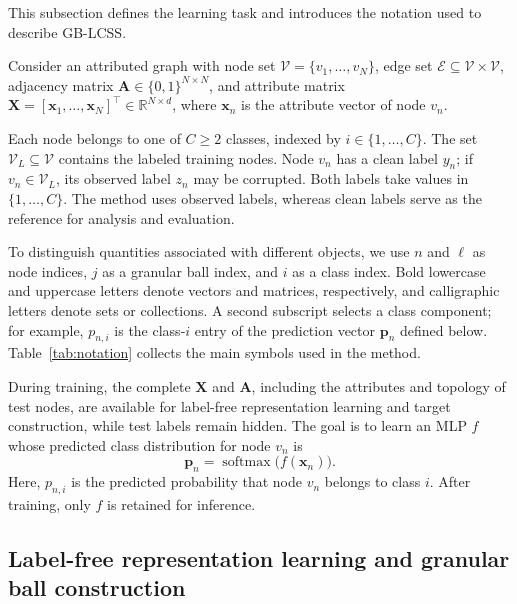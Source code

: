 \documentclass[10pt,letterpaper,nopreprintline]{elsarticle}
\theoremstyle{definition}
\theoremstyle{plain}
\begin{document}
This subsection defines the learning task and introduces the notation used to describe GB-LCSS.

Consider an attributed graph with node set \(\mathcal V=\{v_1,\ldots,v_N\}\), edge set \(\mathcal E\subseteq\mathcal V\times\mathcal V\), adjacency matrix \(\mathbf A\in\{0,1\}^{N\times N}\), and attribute matrix \(\mathbf X=[\mathbf x_1,\ldots,\mathbf x_N]^\top\in\mathbb R^{N\times d}\), where \(\mathbf x_n\) is the attribute vector of node \(v_n\).

Each node belongs to one of \(C\geq2\) classes, indexed by \(i\in\{1,\ldots,C\}\). The set \(\mathcal V_L\subseteq\mathcal V\) contains the labeled training nodes. Node \(v_n\) has a clean label \(y_n\); if \(v_n\in\mathcal V_L\), its observed label \(z_n\) may be corrupted. Both labels take values in \(\{1,\ldots,C\}\). The method uses observed labels, whereas clean labels serve as the reference for analysis and evaluation.

To distinguish quantities associated with different objects, we use \(n\) and \(\ell\) as node indices, \(j\) as a granular ball index, and \(i\) as a class index. Bold lowercase and uppercase letters denote vectors and matrices, respectively, and calligraphic letters denote sets or collections. A second subscript selects a class component; for example, \(p_{n,i}\) is the class-\(i\) entry of the prediction vector \(\mathbf p_n\) defined below. Table~\ref{tab:notation} collects the main symbols used in the method.



During training, the complete \(\mathbf X\) and \(\mathbf A\), including the attributes and topology of test nodes, are available for label-free representation learning and target construction, while test labels remain hidden. The goal is to learn an MLP \(f\) whose predicted class distribution for node \(v_n\) is
\begin{equation}\label{eq:1}
\mathbf p_n=\operatorname{softmax}\bigl(f(\mathbf x_n)\bigr).
\end{equation}
Here, \(p_{n,i}\) is the predicted probability that node \(v_n\) belongs to class \(i\). After training, only \(f\) is retained for inference.

\subsection{Label-free representation learning and granular ball construction}\label{sec:3.2}
\end{document}
